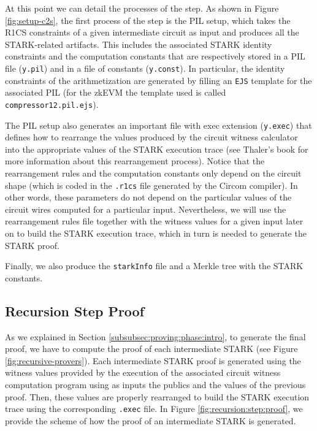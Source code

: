 At this point we can detail the processes of the \ctos step.
As shown in Figure \ref{fig:setup-c2s}, the first process of the \ctos step is the PIL setup, which takes the R1CS constraints of a given intermediate circuit as input and produces all the STARK-related artifacts.
This includes the associated STARK identity constraints and the computation constants
that are respectively stored in a PIL file (\texttt{y.pil}) and in a file of constants
(\texttt{y.const}).
In particular, the identity constraints of the  arithmetization are generated by filling an \texttt{EJS} template for the associated PIL (for the zkEVM the template used is called \texttt{compressor12.pil.ejs}). 

The PIL setup also generates an important file with exec extension (\texttt{y.exec})
that defines how to rearrange the values produced by the circuit witness calculator into the appropriate values of the STARK execution trace (see Thaler's book for more information about this rearrangement process). 
Notice that the rearrangement rules and the computation constants only depend on 
the circuit shape (which is coded in the \texttt{.r1cs} file generated by the Circom compiler). In other words, these parameters do not depend on the particular values of the circuit wires computed for a particular input.
Nevertheless, we will use the rearrangement rules file together with the witness values for a given input later on to build the STARK execution trace, which in turn is needed to generate the STARK proof.

Finally, we also produce the \texttt{starkInfo} file and a Merkle tree with the
STARK constants.

\subsection{Recursion Step Proof \label{subsec:recursion:step:proof}}

As we explained in Section \ref{subsubsec:proving:phase:intro}, to generate the final proof, we have to compute the proof of each 
intermediate STARK (see Figure \ref{fig:recursive-provers}).
Each intermediate STARK proof is generated using the witness values provided by the execution of the associated circuit witness computation program using as inputs the publics and the values of the previous proof.
Then, these values are properly rearranged to build the STARK execution trace using the corresponding \texttt{.exec} file.
In Figure \ref{fig:recursion:step:proof}, we provide the scheme of how the proof of an intermediate STARK is generated. 

